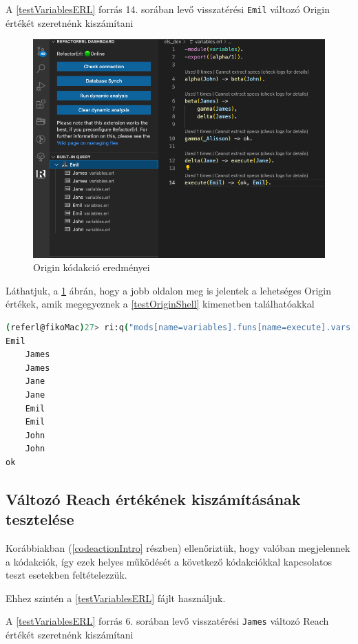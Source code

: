 A \ref{testVariablesERL} forrás 14. sorában levő visszatérési \lstinline{Emil} változó Origin értékét szeretnénk kiszámítani


\begin{figure}[H]
  \centering
  \includegraphics[width=0.9\linewidth]{images/testCases/testVarOr.png}
  \caption{Origin kódakció eredményei}
  \label{fig:testVarOr}
\end{figure}


Láthatjuk, a \ref{fig:testVarOr} ábrán, hogy a jobb oldalon meg is jelentek a lehetséges Origin értékek, amik megegyeznek a \ref{testOriginShell} kimenetben találhatóakkal


\lstset{caption=Válltozó Origin értéke Shellből, label=src:sh} \label{testOriginShell}
\begin{lstlisting}[language={sh}]  
(referl@fikoMac)27> ri:q("mods[name=variables].funs[name=execute].vars[name=Emil].refs.origin").    
Emil
    James
    James
    Jane
    Jane
    Emil
    Emil
    John
    John
ok
\end{lstlisting}


\subsection{Változó Reach értékének kiszámításának tesztelése}


Korábbiakban (\ref{codeactionIntro} részben) ellenőriztük, hogy valóban megjelennek a kódakciók, így ezek helyes működését a következő kódakciókkal kapcsolatos teszt esetekben feltételezzük.

\noindent Ehhez szintén a \ref{testVariablesERL} fájlt használjuk.
 

A \ref{testVariablesERL} forrás 6. sorában levő visszatérési \lstinline{James} változó Reach értékét szeretnénk kiszámítani


